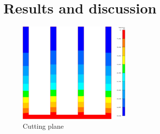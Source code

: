 \section{Results and discussion}
\begin{figure}[h]
    \centering
    \includegraphics[width=0.5\textwidth]{../figures/heatsink4_h105_gmf005.png}
    \caption{Cutting plane}
    \label{fig:heatsink4_h105_gmf005}
\end{figure}